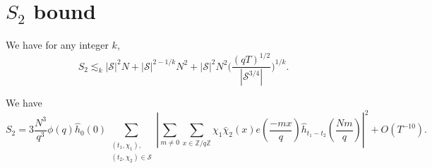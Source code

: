 \section{$S_2$ bound}
\begin{proposition}\label{s2bound}
    We have for any integer $k$,
    \[
    S_2\lesssim_k |\mathcal{S}|^2N+|\mathcal{S}|^{2-1/k}N^2+|\mathcal{S}|^2N^2\Big(\frac{(qT)^{1/2}}{|\mathcal{S}^{3/4}|}\Big)^{1/k}.
    \]
\end{proposition}

\begin{lemma}
    We have 
    \[
    S_2 = 3\frac{N^3}{q^3} \phi(q) \hat{h}_{0}\left(0\right) \sum_{\substack{(t_1,\chi_1),\\(t_2,\chi_2)\in\mathcal{S}}} \left|\sum_{m\neq 0} \sum_{x \in \mathbb{Z}/q\mathbb{Z}}\chi_1\bar{\chi}_2(x) e\left(\frac{-mx}{q}\right)
     \hat{h}_{t_1-t_2}\left(\frac{Nm}{q}\right)\right|^2 + O(T^{-10}).
\]
\end{lemma}
